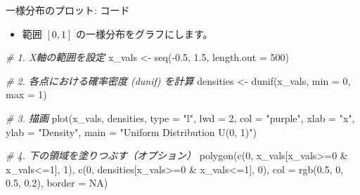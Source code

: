 \documentclass[
  ignorenonframetext,
]{beamer}
\newenvironment{Shaded}{\begin{snugshade}}{\end{snugshade}}
\newcommand{\AttributeTok}[1]{\textcolor[rgb]{0.77,0.63,0.00}{#1}}
\newcommand{\CommentTok}[1]{\textcolor[rgb]{0.56,0.35,0.01}{\textit{#1}}}
\newcommand{\ConstantTok}[1]{\textcolor[rgb]{0.00,0.00,0.00}{#1}}
\newcommand{\DecValTok}[1]{\textcolor[rgb]{0.00,0.00,0.81}{#1}}
\newcommand{\FloatTok}[1]{\textcolor[rgb]{0.00,0.00,0.81}{#1}}
\newcommand{\FunctionTok}[1]{\textcolor[rgb]{0.00,0.00,0.00}{#1}}
\newcommand{\NormalTok}[1]{#1}
\newcommand{\OtherTok}[1]{\textcolor[rgb]{0.56,0.35,0.01}{#1}}
\newcommand{\SpecialCharTok}[1]{\textcolor[rgb]{0.00,0.00,0.00}{#1}}
\newcommand{\StringTok}[1]{\textcolor[rgb]{0.31,0.60,0.02}{#1}}
\providecommand{\tightlist}{%
  \setlength{\itemsep}{0pt}\setlength{\parskip}{0pt}}
\begin{document}
\begin{frame}[fragile]{一様分布のプロット: コード}
\protect\hypertarget{ux4e00ux69d8ux5206ux5e03ux306eux30d7ux30edux30c3ux30c8-ux30b3ux30fcux30c9}{}
\begin{itemize}
\tightlist
\item
  範囲 \([0, 1]\) の一様分布をグラフにします。
\end{itemize}

\scriptsize

\begin{Shaded}
\begin{Highlighting}[]
\CommentTok{\# 1. X軸の範囲を設定}
\NormalTok{x\_vals }\OtherTok{\textless{}{-}} \FunctionTok{seq}\NormalTok{(}\SpecialCharTok{{-}}\FloatTok{0.5}\NormalTok{, }\FloatTok{1.5}\NormalTok{, }\AttributeTok{length.out =} \DecValTok{500}\NormalTok{)}

\CommentTok{\# 2. 各点における確率密度 (dunif) を計算}
\NormalTok{densities }\OtherTok{\textless{}{-}} \FunctionTok{dunif}\NormalTok{(x\_vals, }\AttributeTok{min =} \DecValTok{0}\NormalTok{, }\AttributeTok{max =} \DecValTok{1}\NormalTok{)}

\CommentTok{\# 3. 描画}
\FunctionTok{plot}\NormalTok{(x\_vals, densities, }\AttributeTok{type =} \StringTok{"l"}\NormalTok{, }\AttributeTok{lwd =} \DecValTok{2}\NormalTok{, }\AttributeTok{col =} \StringTok{"purple"}\NormalTok{,}
     \AttributeTok{xlab =} \StringTok{"x"}\NormalTok{, }\AttributeTok{ylab =} \StringTok{"Density"}\NormalTok{, }\AttributeTok{main =} \StringTok{"Uniform Distribution U(0, 1)"}\NormalTok{)}

\CommentTok{\# 4. 下の領域を塗りつぶす（オプション）}
\FunctionTok{polygon}\NormalTok{(}\FunctionTok{c}\NormalTok{(}\DecValTok{0}\NormalTok{, x\_vals[x\_vals}\SpecialCharTok{\textgreater{}=}\DecValTok{0} \SpecialCharTok{\&}\NormalTok{ x\_vals}\SpecialCharTok{\textless{}=}\DecValTok{1}\NormalTok{], }\DecValTok{1}\NormalTok{), }
        \FunctionTok{c}\NormalTok{(}\DecValTok{0}\NormalTok{, densities[x\_vals}\SpecialCharTok{\textgreater{}=}\DecValTok{0} \SpecialCharTok{\&}\NormalTok{ x\_vals}\SpecialCharTok{\textless{}=}\DecValTok{1}\NormalTok{], }\DecValTok{0}\NormalTok{), }
        \AttributeTok{col =} \FunctionTok{rgb}\NormalTok{(}\FloatTok{0.5}\NormalTok{, }\DecValTok{0}\NormalTok{, }\FloatTok{0.5}\NormalTok{, }\FloatTok{0.2}\NormalTok{), }\AttributeTok{border =} \ConstantTok{NA}\NormalTok{)}
\end{Highlighting}
\end{Shaded}

\normalsize
\end{frame}
\end{document}
